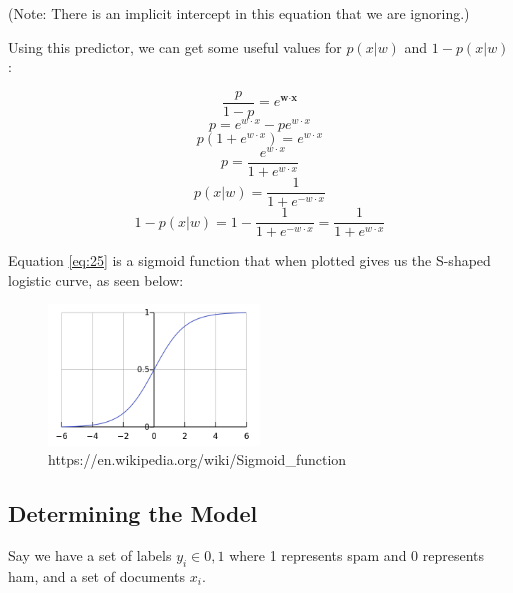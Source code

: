 (Note: There is an implicit intercept in this equation that we are ignoring.)

Using this predictor, we can get some useful values for $p(x|w)$ and $1-p(x|w)$:

\begin{equation}\label{eq:20}
\frac{p}{1-p} = e^{\textbf{w} \cdot \textbf{x}}
\end{equation}
\begin{equation}
p = e^{w \cdot x} - pe^{w \cdot x}
\end{equation}
\begin{equation}
p(1+e^{w \cdot x}) = e^{w \cdot x}
\end{equation}
\begin{equation}\label{eq:24}
p = \frac{e^{w \cdot x}}{1+e^{w \cdot x}}
\end{equation}
\begin{equation}\label{eq:25}
p(x|w) = \frac{1}{1+e^{-w \cdot x}}
\end{equation}
\begin{equation}\label{eq:26}
1-p(x|w) = 1 - \frac{1}{1+e^{-w \cdot x}} = \frac{1}{1+e^{w \cdot x}}
\end{equation}

Equation \ref{eq:25} is a sigmoid function that when plotted gives us the S-shaped logistic curve, as seen below:
\begin{figure}[ht]
  \begin{center}
    \includegraphics[width=0.5\textwidth]{figures/Logistic-curve.png}
    \caption{https://en.wikipedia.org/wiki/Sigmoid\_function}
    \label{fig:logistic}
  \end{center}
\end{figure}

\subsection{Determining the Model}
Say we have a set of labels $y_i \in {0,1}$ where 1 represents spam and 0 represents ham, and a set of documents $x_i$.

